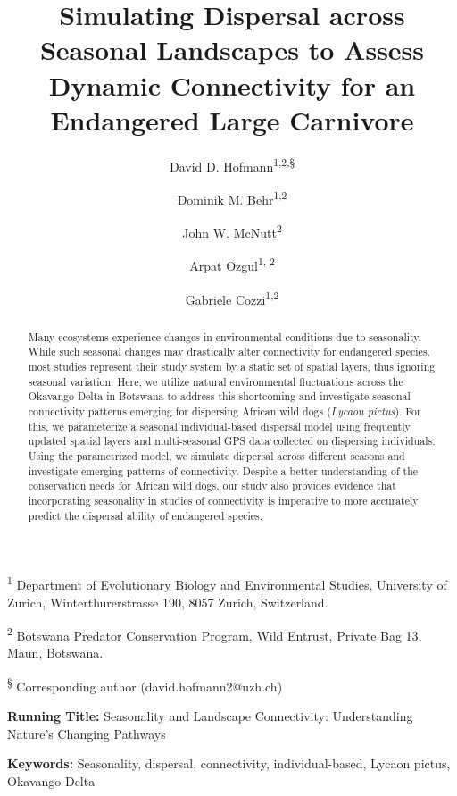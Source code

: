 \documentclass[abstract=on,10pt,a4paper,bibliography=totocnumbered]{article}
\title{Simulating Dispersal across Seasonal Landscapes to Assess Dynamic
Connectivity for an Endangered Large Carnivore}
\author{
  David D. Hofmann\textsuperscript{1,2,\S} \orcid{0000-0003-3477-4365} \and
  Dominik M. Behr\textsuperscript{1,2} \orcid{0000-0001-7378-8538} \and
  John W. McNutt\textsuperscript{2} \and
  Arpat Ozgul\textsuperscript{1, 2} \orcid{0000-0001-7477-2642} \and
  Gabriele Cozzi\textsuperscript{1,2} \orcid{0000-0002-1744-1940}
}
\begin{document}



\maketitle

\begin{flushleft}

\vspace{0.5cm}

\textsuperscript{1} Department of Evolutionary Biology and Environmental
Studies, University of Zurich, Winterthurerstrasse 190, 8057 Zurich,
Switzerland.

\textsuperscript{2} Botswana Predator Conservation Program, Wild Entrust,
Private Bag 13, Maun, Botswana.

\textsuperscript{\S} Corresponding author (david.hofmann2@uzh.ch)

\vspace{4cm}

\textbf{Running Title:} Seasonality and Landscape Connectivity: Understanding
Nature's Changing Pathways

\vspace{0.5cm}

\textbf{Keywords:} Seasonality, dispersal, connectivity, individual-based,
Lycaon pictus, Okavango Delta

\end{flushleft}

\newpage
\begin{abstract}
Many ecosystems experience changes in environmental conditions due to
seasonality. While such seasonal changes may drastically alter connectivity for
endangered species, most studies represent their study system by a static set of
spatial layers, thus ignoring seasonal variation. Here, we utilize natural
environmental fluctuations across the Okavango Delta in Botswana to address this
shortcoming and investigate seasonal connectivity patterns emerging for
dispersing African wild dogs (\textit{Lycaon pictus}). For this, we parameterize
a seasonal individual-based dispersal model using frequently updated spatial
layers and multi-seasonal GPS data collected on dispersing individuals. Using
the parametrized model, we simulate dispersal across different seasons and
investigate emerging patterns of connectivity. Despite a better understanding of
the conservation needs for African wild dogs, our study also provides evidence
that incorporating seasonality in studies of connectivity is imperative to more
accurately predict the dispersal ability of endangered species.
\end{abstract}
\end{document}
